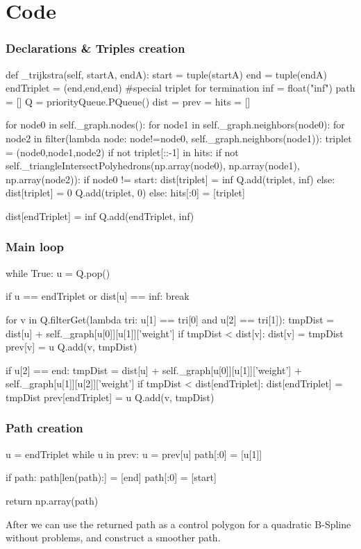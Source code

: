 \section{Code}

\begin{frame}[fragile]
  \frametitle{Declarations \& Triples creation}
  \begin{pblock}
def _trijkstra(self, startA, endA):
  start = tuple(startA)
  end = tuple(endA)
  endTriplet = (end,end,end) #special triplet for termination
  inf = float("inf")
  path = []
  Q = priorityQueue.PQueue()
  dist = {}
  prev = {}
  hits = []
  \end{pblock}
  \begin{pblock}
  for node0 in self._graph.nodes():
    for node1 in self._graph.neighbors(node0):
      for node2 in filter(lambda node: node!=node0, self._graph.neighbors(node1)):
        triplet = (node0,node1,node2)
        if not triplet[::-1] in hits:
          if not self._triangleIntersectPolyhedrons(np.array(node0), np.array(node1), np.array(node2)):
            if node0 != start:
              dist[triplet] = inf
              Q.add(triplet, inf)
            else:
              dist[triplet] = 0
              Q.add(triplet, 0)
          else:
            hits[:0] = [triplet]

  dist[endTriplet] = inf
  Q.add(endTriplet, inf)
  \end{pblock}
\end{frame}

\begin{frame}[fragile]
  \frametitle{Main loop}
  \begin{pblock}
while True:
  u = Q.pop()

  if u == endTriplet or dist[u] == inf:
    break

  for v in Q.filterGet(lambda tri: u[1] == tri[0] and u[2] == tri[1]):
    tmpDist = dist[u] + self._graph[u[0]][u[1]]['weight']
    if tmpDist < dist[v]:
      dist[v] = tmpDist
      prev[v] = u
      Q.add(v, tmpDist)

  if u[2] == end:
    tmpDist = dist[u] + self._graph[u[0]][u[1]]['weight'] + self._graph[u[1]][u[2]]['weight']
    if tmpDist < dist[endTriplet]:
      dist[endTriplet] = tmpDist
      prev[endTriplet] = u
      Q.add(v, tmpDist)
  \end{pblock}
\end{frame}

\begin{frame}[fragile]
  \frametitle{Path creation}
  \begin{pblock}
u = endTriplet
while u in prev:
  u = prev[u]
  path[:0] = [u[1]]

if path:
  path[len(path):] = [end]
  path[:0] = [start]

return np.array(path)
  \end{pblock}\pause
  \begin{block}{After}
    we can use the returned \alert{path} as a \alert{control polygon}
    for a quadratic
    B-Spline without problems, and construct a smoother path.
  \end{block}
\end{frame}

